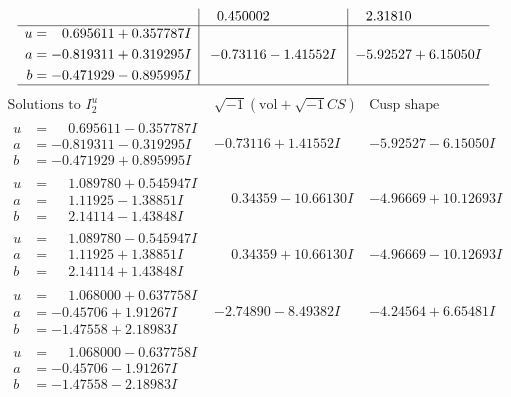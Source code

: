 \documentclass[1p]{elsarticle_modified}
\theoremstyle{definition}
\newcommand{\I}{\sqrt{-1}}
\begin{document}
$$\begin{array}{c|c|c}
 & \phantom{-}0.450002\phantom{ +0.000000I} & \phantom{-}2.31810\phantom{ +0.000000I} \\ \hline\begin{aligned}
u &= \phantom{-}0.695611 + 0.357787 I \\
a &= -0.819311 + 0.319295 I \\
b &= -0.471929 - 0.895995 I\end{aligned}
 & -0.73116 - 1.41552 I & -5.92527 + 6.15050 I\\
 \hline 
 \end{array}$$\newpage$$\begin{array}{c|c|c}  
\text{Solutions to }I^u_{2}& \I (\text{vol} + \sqrt{-1}CS) & \text{Cusp shape}\\
 \hline 
\begin{aligned}
u &= \phantom{-}0.695611 - 0.357787 I \\
a &= -0.819311 - 0.319295 I \\
b &= -0.471929 + 0.895995 I\end{aligned}
 & -0.73116 + 1.41552 I & -5.92527 - 6.15050 I \\ \hline\begin{aligned}
u &= \phantom{-}1.089780 + 0.545947 I \\
a &= \phantom{-}1.11925 - 1.38851 I \\
b &= \phantom{-}2.14114 - 1.43848 I\end{aligned}
 & \phantom{-}0.34359 - 10.66130 I & -4.96669 + 10.12693 I \\ \hline\begin{aligned}
u &= \phantom{-}1.089780 - 0.545947 I \\
a &= \phantom{-}1.11925 + 1.38851 I \\
b &= \phantom{-}2.14114 + 1.43848 I\end{aligned}
 & \phantom{-}0.34359 + 10.66130 I & -4.96669 - 10.12693 I \\ \hline\begin{aligned}
u &= \phantom{-}1.068000 + 0.637758 I \\
a &= -0.45706 + 1.91267 I \\
b &= -1.47558 + 2.18983 I\end{aligned}
 & -2.74890 - 8.49382 I & -4.24564 + 6.65481 I \\ \hline\begin{aligned}
u &= \phantom{-}1.068000 - 0.637758 I \\
a &= -0.45706 - 1.91267 I \\
b &= -1.47558 - 2.18983 I\end{aligned}

\end{array}$$
\end{document}
